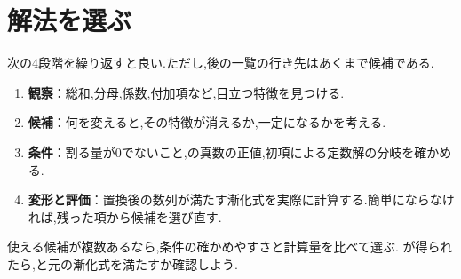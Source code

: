 
\section{解法を選ぶ}\label{節：解法を選ぶ}

次の4段階を繰り返すと良い.ただし,後の一覧の行き先はあくまで候補である.
\begin{enumerate}
  \item \textbf{観察}：総和,分母,係数,付加項など,目立つ特徴を見つける.
  \item \textbf{候補}：何を変えると,その特徴が消えるか,一定になるかを考える.
  \item \textbf{条件}：割る量が0でないこと,の真数の正値,初項による定数解の分岐を確かめる.
  \item \textbf{変形と評価}：置換後の数列が満たす漸化式を実際に計算する.簡単にならなければ,残った項から候補を選び直す.
\end{enumerate}
使える候補が複数あるなら,条件の確かめやすさと計算量を比べて選ぶ.
が得られたら,と元の漸化式を満たすか確認しよう.
\BookFigFlowchart

